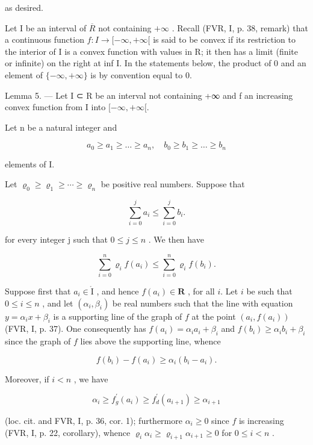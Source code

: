 as desired.

Let I be an interval of \(\overline{R}\) not containing \(+\infty\) . Recall (FVR, I, p. 38, remark) that a continuous function \(f: I \to [-\infty, +\infty[\) is said to be convex if its restriction to the interior of I is a convex function with values in R; it then has a limit (finite or infinite) on the right at inf I. In the statements below, the product of 0 and an element of \(\{-\infty, +\infty\}\) is by convention equal to 0.

Lemma 5. --- Let I ⊂ R be an interval not containing +∞ and f an increasing convex function from I into \([-\infty, +\infty[\).

Let n be a natural integer and

\[
a _ {0} \geqslant a _ {1} \geqslant \dots \geqslant a _ {n}, \quad b _ {0} \geqslant b _ {1} \geqslant \dots \geqslant b _ {n}
\]

elements of I.

Let \(\varrho_{0} \geqslant \varrho_{1} \geqslant \cdots \geqslant \varrho_{n}\) be positive real numbers. Suppose that

\[
\sum_ {i = 0} ^ {j} a _ {i} \leqslant \sum_ {i = 0} ^ {j} b _ {i}.\tag{5}
\]

for every integer j such that \(0 \leqslant j \leqslant n\) . We then have

\[
\sum_ {i = 0} ^ {n} \varrho_ {i} f (a _ {i}) \leqslant \sum_ {i = 0} ^ {n} \varrho_ {i} f (b _ {i}).\tag{6}
\]

Suppose first that \(a_i \in \mathring{\mathrm{I}}\) , and hence \(f(a_i) \in \mathbf{R}\) , for all \(i\). Let \(i\) be such that \(0 \leqslant i \leqslant n\) , and let \((\alpha_i, \beta_i)\) be real numbers such that the line with equation \(y = \alpha_i x + \beta_i\) is a supporting line of the graph of \(f\) at the point \((a_i, f(a_i))\) (FVR, I, p. 37). One consequently has \(f(a_i) = \alpha_i a_i + \beta_i\) and \(f(b_i) \geqslant \alpha_i b_i + \beta_i\) since the graph of \(f\) lies above the supporting line, whence

\[
f (b _ {i}) - f (a _ {i}) \geqslant \alpha_ {i} (b _ {i} - a _ {i}).\tag{7}
\]

Moreover, if \(i < n\) , we have

\[
\alpha_ {i} \geqslant f _ {g} ^ {\prime} (a _ {i}) \geqslant f _ {d} ^ {\prime} (a _ {i + 1}) \geqslant \alpha_ {i + 1}
\]

(loc. cit. and FVR, I, p. 36, cor. 1); furthermore \(\alpha_{i} \geqslant 0\) since \(f\) is increasing (FVR, I, p. 22, corollary), whence \(\varrho_{i}\alpha_{i} \geqslant \varrho_{i+1}\alpha_{i+1} \geqslant 0\) for \(0 \leqslant i < n\) .

